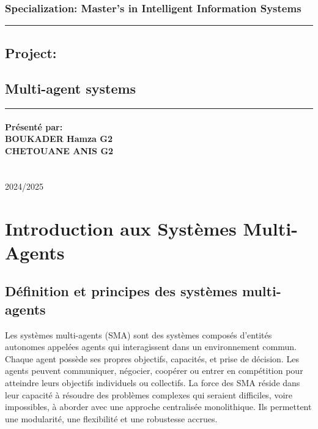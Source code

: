 \documentclass[a4paper,12pt]{report}
\begin{document}
\begin{center}
    \subsection*{\textnormal{Specialization: Master's in Intelligent Information Systems}}
    \vspace{30pt}
    \rule{17cm}{0.5pt}
    \section*{Project:}
    \section*{\textbf{Multi-agent systems}}
    \rule{17cm}{0.5pt}
\end{center}

\vspace{20pt}
\subsubsection*{ \textbf{Présenté par:} \\ 
\textbf{BOUKADER} \textnormal{Hamza G2}\\
\textbf{CHETOUANE} \textnormal{ANIS G2}\\
\textbf{} \textnormal{}\\
}
\vspace{30pt}


\vspace{180pt}
2024/2025

\vspace{15pt}
\fontsize{12}{14}\selectfont



\newpage  %
\thispagestyle{empty}
\tableofcontents

\newpage  %
\thispagestyle{empty}
\listoffigures


\newpage %

\chapter{Introduction aux Systèmes Multi-Agents}

\section{Définition et principes des systèmes multi-agents}
Les systèmes multi-agents (SMA) sont des systèmes composés d'entités autonomes appelées agents qui interagissent dans un environnement commun. Chaque agent possède ses propres objectifs, capacités, et prise de décision. Les agents peuvent communiquer, négocier, coopérer ou entrer en compétition pour atteindre leurs objectifs individuels ou collectifs. La force des SMA réside dans leur capacité à résoudre des problèmes complexes qui seraient difficiles, voire impossibles, à aborder avec une approche centralisée monolithique. Ils permettent une modularité, une flexibilité et une robustesse accrues.
\end{document}
